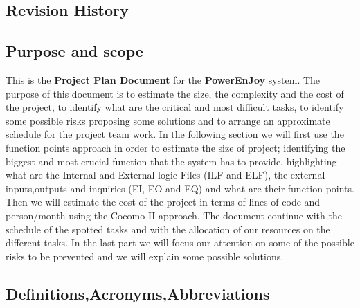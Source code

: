 \subsection{Revision History}





\subsection{Purpose and scope}
This  is the \textbf{Project Plan Document} for the \textbf{PowerEnJoy} system. The purpose of this document is to estimate the size, the  complexity and the cost of the project, to identify what are the critical and most difficult tasks, to identify some possible risks proposing some solutions and to arrange an approximate schedule for the project team work.
In the following section we will  first use the function points approach in order to estimate the size of project; identifying the biggest and most crucial function that the system has to provide, highlighting 
what are the Internal and External logic Files (ILF and ELF), the external inputs,outputs and inquiries (EI, EO and EQ) and what are their function points. Then we will estimate the cost of the project in terms of lines of code and person/month using the Cocomo II approach. 
The document continue with the schedule of the  spotted tasks and with the allocation of our resources on the different tasks. 
In the last part  we  will  focus our attention on some of the possible risks to be prevented and we will explain some possible solutions. 




\subsection{Definitions,Acronyms,Abbreviations}






